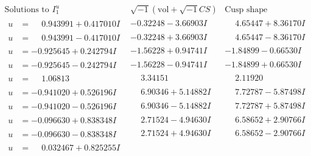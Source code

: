 \documentclass[1p]{elsarticle_modified}
\theoremstyle{definition}
\newcommand{\I}{\sqrt{-1}}
\begin{document}
$$\begin{array}{c|c|c}  
\text{Solutions to }I^u_{1}& \I (\text{vol} + \sqrt{-1}CS) & \text{Cusp shape}\\
 \hline 
\begin{aligned}
u &= \phantom{-}0.943991 + 0.417010 I\end{aligned}
 & -0.32248 - 3.66903 I & \phantom{-}4.65447 + 8.36170 I \\ \hline\begin{aligned}
u &= \phantom{-}0.943991 - 0.417010 I\end{aligned}
 & -0.32248 + 3.66903 I & \phantom{-}4.65447 - 8.36170 I \\ \hline\begin{aligned}
u &= -0.925645 + 0.242794 I\end{aligned}
 & -1.56228 + 0.94741 I & -1.84899 - 0.66530 I \\ \hline\begin{aligned}
u &= -0.925645 - 0.242794 I\end{aligned}
 & -1.56228 - 0.94741 I & -1.84899 + 0.66530 I \\ \hline\begin{aligned}
u &= \phantom{-}1.06813\phantom{ +0.000000I}\end{aligned}
 & \phantom{-}3.34151\phantom{ +0.000000I} & \phantom{-}2.11920\phantom{ +0.000000I} \\ \hline\begin{aligned}
u &= -0.941020 + 0.526196 I\end{aligned}
 & \phantom{-}6.90346 + 5.14882 I & \phantom{-}7.72787 - 5.87498 I \\ \hline\begin{aligned}
u &= -0.941020 - 0.526196 I\end{aligned}
 & \phantom{-}6.90346 - 5.14882 I & \phantom{-}7.72787 + 5.87498 I \\ \hline\begin{aligned}
u &= -0.096630 + 0.838348 I\end{aligned}
 & \phantom{-}2.71524 - 4.94630 I & \phantom{-}6.58652 + 2.90766 I \\ \hline\begin{aligned}
u &= -0.096630 - 0.838348 I\end{aligned}
 & \phantom{-}2.71524 + 4.94630 I & \phantom{-}6.58652 - 2.90766 I \\ \hline\begin{aligned}
u &= \phantom{-}0.032467 + 0.825255 I\end{aligned}

\end{array}$$
\end{document}
